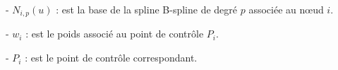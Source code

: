 - \( N_{i,p}(u) \) : est la base de la spline B-spline de degré \( p \) associée au nœud \( i \).

\vspace{-0,2 cm}

- \( w_i \) : est le poids associé au point de contrôle \( P_i \).

\vspace{-0,2 cm}

- \( P_i \) : est le point de contrôle correspondant.

